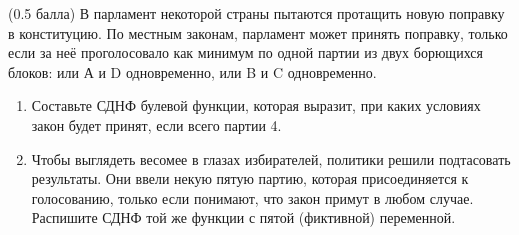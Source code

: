 \question
(0.5 балла) В парламент некоторой страны пытаются протащить новую поправку в конституцию. По местным законам, парламент может принять поправку, только если за неё проголосовало как минимум по одной партии из двух борющихся блоков: или А и D одновременно, или B и C одновременно.

\begin{enumerate}
    \item Составьте СДНФ булевой функции, которая выразит, при каких условиях закон будет принят, если всего партии 4.
    \item Чтобы выглядеть весомее в глазах избирателей, политики решили подтасовать результаты.  Они ввели некую пятую партию, которая присоединяется к голосованию, только если понимают, что закон примут в любом случае. Распишите СДНФ той же функции с пятой (фиктивной) переменной.
\end{enumerate}